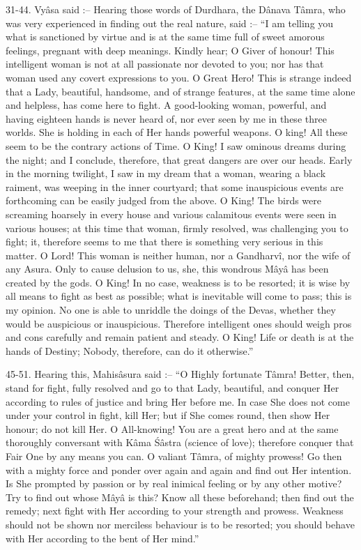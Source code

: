 31-44. Vy\^asa said :-- Hearing those words of Durdhara, the D\^anava T\^amra, who was very experienced in finding out the real nature, said :-- ``I am telling you what is sanctioned by virtue and is at the same time full of sweet amorous feelings, pregnant with deep meanings. Kindly hear; O Giver of honour! This intelligent woman is not at all passionate nor devoted to you; nor has that woman used any covert expressions to you. O Great Hero! This is strange indeed that a Lady, beautiful, handsome, and of strange features, at the same time alone and helpless, has come here to fight. A good-looking woman, powerful, and having eighteen hands is never heard of, nor ever seen by me in these three worlds. She is holding in each of Her hands powerful weapons. O king! All these seem to be the contrary actions of Time. O King! I saw ominous dreams during the night; and I conclude, therefore, that great dangers are over our heads. Early in the morning twilight, I saw in my dream that a woman, wearing a black raiment, was weeping in the inner courtyard; that some inauspicious events are forthcoming can be easily judged from the above. O King! The birds were screaming hoarsely in every house and various calamitous events were seen in various houses; at this time that woman, firmly resolved, was challenging you to fight; it, therefore seems to me that there is something very serious in this matter. O Lord! This woman is neither human, nor a Gandharv\^i, nor the wife of any Asura. Only to cause delusion to us, she, this wondrous M\^ay\^a has been created by the gods. O King! In no case, weakness is to be resorted; it is wise by all means to fight as best as possible; what is inevitable will come to pass; this is my opinion. No one is able to unriddle the doings of the Devas, whether they would be auspicious or inauspicious. Therefore intelligent ones should weigh pros and cons carefully and remain patient and steady. O King! Life or death is at the hands of Destiny; Nobody, therefore, can do it otherwise.''

45-51. Hearing this, Mahis\^asura said :-- ``O Highly fortunate T\^amra! Better, then, stand for fight, fully resolved and go to that Lady, beautiful, and conquer Her according to rules of justice and bring Her before me. In case She does not come under your control in fight, kill Her; but if She comes round, then show Her honour; do not kill Her. O All-knowing! You are a great hero and at the same thoroughly conversant with K\^ama \'S\^astra (science of love); therefore conquer that Fair One by any means you can. O valiant T\^amra, of mighty prowess! Go then with a mighty force and ponder over again and again and find out Her intention. Is She prompted by passion or by real inimical feeling or by any other motive? Try to find out whose M\^ay\^a is this? Know all these beforehand; then find out the remedy; next fight with Her according to your strength and prowess. Weakness should not be shown nor merciless behaviour is to be resorted; you should behave with Her according to the bent of Her mind.''

